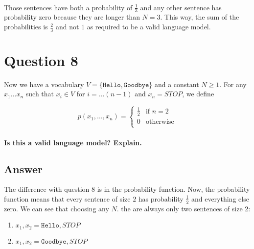 \documentclass{article}
\begin{document}
\paragraph{} Those sentences have both a probability of $\frac{1}{3}$ and any other sentence has probability zero because they are longer than $N=3$. This way, the sum of the probabilities is $\frac{2}{3}$ and not $1$ as required to be a valid language model.

\clearpage

\section*{Question 8}

\paragraph{} Now we have a vocabulary $V = \{\texttt{Hello}, \texttt{Goodbye}\}$ and a constant $N \ge 1$. For any $x_1 \dots x_n$ such that $x_i \in V$ for $i = \dots (n-1)$ and $x_n = STOP$, we define

\begin{equation*}
p(x_1, \dots, x_n) = \begin{cases}
       \frac{1}{2} & \text{if $n = 2$} \\
       0 & \text{otherwise} \\ 
     \end{cases}
\end{equation*}

\paragraph{Is this a valid language model? Explain.}

\subsection*{Answer}

The difference with question 8 is in the probability function. Now, the probability function means that every sentence of size $2$ has probability $\frac{1}{2}$ and everything else zero. We can see that choosing any $N$. the are always only two sentences of size 2:

\begin{enumerate}
    \item $x_1, x_2 = \texttt{Hello}, STOP$
    \item $x_1, x_2 = \texttt{Goodbye}, STOP$
\end{enumerate}
\end{document}
